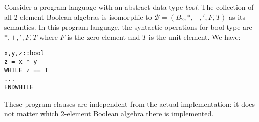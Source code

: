 \begin{example}
Consider a program language with an abstract data type \emph{bool}. The  collection of all 2-element Boolean algebras is isomorphic to $\mathcal{B}=\left( B_2,\ast , +, ',F,T \right)$ as its semantics. In this program language, the syntactic operations for bool-type are $\ast , +, ',F,T$ where $F$ is the zero element and $T$ is the unit element. We have:
\begin{verbatim}
x,y,z::bool
z = x * y
WHILE z == T
...
ENDWHILE
\end{verbatim}
These program clauses are independent from the actual implementation: it does not matter which 2-element Boolean algebra there is implemented.
\end{example}
